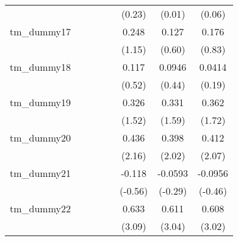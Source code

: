 {\begin{tabular}{l*{7}{c}}
            &                     &                     &                     &                     &      (0.23)         &      (0.01)         &      (0.06)         \\
[1em]
tm\_dummy17  &                     &                     &                     &                     &       0.248         &       0.127         &       0.176         \\
            &                     &                     &                     &                     &      (1.15)         &      (0.60)         &      (0.83)         \\
[1em]
tm\_dummy18  &                     &                     &                     &                     &       0.117         &      0.0946         &      0.0414         \\
            &                     &                     &                     &                     &      (0.52)         &      (0.44)         &      (0.19)         \\
[1em]
tm\_dummy19  &                     &                     &                     &                     &       0.326         &       0.331         &       0.362         \\
            &                     &                     &                     &                     &      (1.52)         &      (1.59)         &      (1.72)         \\
[1em]
tm\_dummy20  &                     &                     &                     &                     &       0.436\sym{*}  &       0.398\sym{*}  &       0.412\sym{*}  \\
            &                     &                     &                     &                     &      (2.16)         &      (2.02)         &      (2.07)         \\
[1em]
tm\_dummy21  &                     &                     &                     &                     &      -0.118         &     -0.0593         &     -0.0956         \\
            &                     &                     &                     &                     &     (-0.56)         &     (-0.29)         &     (-0.46)         \\
[1em]
tm\_dummy22  &                     &                     &                     &                     &       0.633\sym{**} &       0.611\sym{**} &       0.608\sym{**} \\
            &                     &                     &                     &                     &      (3.09)         &      (3.04)         &      (3.02)         \\

\end{tabular}}
